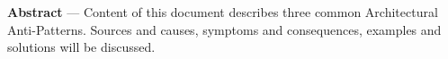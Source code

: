 \begin{center}

\label{abstract}
\textbf{Abstract} --- 
Content of this document describes three common Architectural Anti-Patterns.
Sources and causes, symptoms and consequences, examples and solutions will be discussed.

\end{center}
